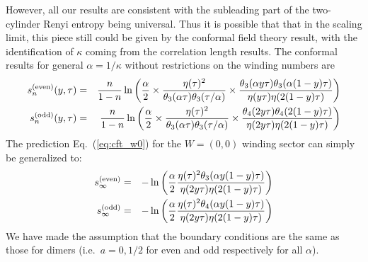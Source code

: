 \documentclass[11pt]{iopart}
\begin{document}
However, all our results are consistent with the subleading part of the two-cylinder Renyi entropy being universal. Thus it is possible that that in the scaling limit, this piece still could be given by the conformal field theory result, with the identification of $\kappa$ coming from the correlation length results.
The conformal results for general $\alpha=1/\kappa$ without restrictions on the winding numbers are
\begin{eqnarray}\label{eq:cft_prediction_gen}
 s_n^{\rm (even)}(y,\tau)&=&\frac{n}{1-n}\ln \left(\frac{\alpha}{2}\times\frac{\eta(\tau)^2}{\theta_3(\alpha\tau)\theta_3(\tau/\alpha)}\times\frac{\theta_3(\alpha y \tau)\theta_3(\alpha(1-y)\tau)}{\eta(y\tau)\eta(2(1-y)\tau)}\right)\\\label{eq:cft_prediction_gen_odd}
 s_n^{\rm (odd)}(y,\tau)&=&\frac{n}{1-n}\ln \left(\frac{\alpha}{2}\times\frac{\eta(\tau)^2}{\theta_3(\alpha\tau)\theta_3(\tau/\alpha)}\times\frac{\theta_4(2y \tau)\theta_4(2(1-y)\tau)}{\eta(2y\tau)\eta(2(1-y)\tau)}\right)
\end{eqnarray}
The prediction Eq.~(\ref{eq:cft_w0}) for the $W=(0,0)$ winding sector can simply be generalized to:
\begin{eqnarray}\label{eq:cft_w0_gen}
 s_\infty^{\rm (even)}&=&-\ln \left(\frac{\alpha}{2}\frac{\eta(\tau)^2\theta_3(\alpha y(1-y)\tau)}{\eta(2y\tau)\eta(2(1-y)\tau)}\right)\\\label{eq:cft_w0_gen2}
 s_\infty^{\rm (odd )}&=&-\ln \left(\frac{\alpha}{2}\frac{\eta(\tau)^2\theta_4(\alpha y(1-y)\tau)}{\eta(2y\tau)\eta(2(1-y)\tau)}\right)
\end{eqnarray}
We have made the assumption that the boundary conditions are the same as those for dimers (i.e.\ $a=0,1/2$ for even and odd respectively for all $\alpha$).
\end{document}
